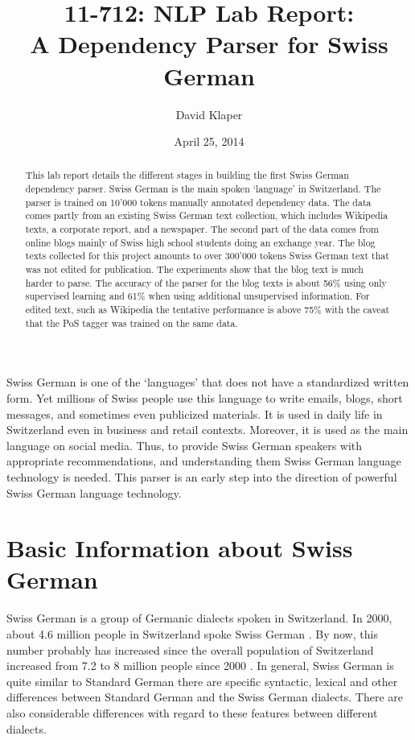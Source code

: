\documentclass[11pt,letterpaper, covington]{article}
\title{11-712: NLP Lab Report: \\
A Dependency Parser for Swiss German}
\author{David Klaper}
\date{April 25, 2014}
\begin{document}
\maketitle
\begin{abstract}
This lab report details the different stages in building the first Swiss German dependency parser. Swiss German is the main spoken `language' in Switzerland. The parser is trained on 10'000 tokens manually annotated dependency data. The data comes partly from an existing Swiss German text collection, which includes Wikipedia texts, a corporate report, and a newspaper. The second part of the data comes from online blogs mainly of Swiss high school students doing an exchange year. The blog texts collected for this project amounts to over 300'000 tokens Swiss German text that was not edited for publication. The experiments show that the blog text is much harder to parse. The accuracy of the parser for the blog texts is about 56\% using only supervised learning and 61\% when using additional unsupervised information. For edited text, such as Wikipedia the tentative performance is above 75\% with the caveat that the PoS tagger was trained on the same data.
\end{abstract}

Swiss German is one of the `languages' that does not have a standardized written form. Yet millions of Swiss people use this language to write emails, blogs, short messages, and sometimes even publicized materials. It is used in daily life in Switzerland even in business and retail contexts. Moreover, it is used as the main language on social media. Thus, to provide Swiss German speakers with appropriate recommendations, and understanding them Swiss German language technology is needed. This parser is an early step into the direction of powerful Swiss German language technology.

\section{Basic Information about Swiss German}

Swiss German is a group of Germanic dialects spoken in Switzerland. In 2000, about 4.6 million people in Switzerland spoke Swiss German \citep{LGC13}. By now, this number probably has increased since the overall population of Switzerland increased from 7.2 to 8 million people since 2000 \citep{BFS13}. In general, Swiss German is quite similar to Standard German there are specific syntactic, lexical and other differences between Standard German and the Swiss German dialects. There are also considerable differences with regard to these features between different dialects. \citep{Scherrer11}
\end{document}
